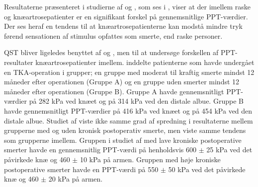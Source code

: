 \begin{table}[H]
	\centering
	\caption{I tabellen ses resultaterne vedrørende PPT-målinger på henholdsvis raske person og knæartrsoe patienter. }
	\label{tab:PPT_rask_syg}
\end{table}\vspace{-.25cm}

Resultaterne præsenteret i studierne af  og , som ses i , viser at der imellem raske og knæartrosepatienter er en signifikant forskel på gennemsnitlige PPT-værdier. Der ses heraf en tendens til at knæartrosepatienterne kan modstå mindre tryk førend sensationen af stimulus opfattes som smerte, end raske personer.

QST bliver ligeledes benyttet af  og , men til at undersøge forskellen af PPT-resultater knæartrosepatienter imellem.  inddelte patienterne som havde undergået en TKA-operation i grupper; en gruppe med moderat til kraftig smerte mindst 12 måneder efter operationen (Gruppe A) og en gruppe uden smerter mindst 12 måneder efter operationen (Gruppe B). Gruppe A havde gennemsnitligt PPT-værdier på 282 kPa ved knæet og på 314 kPa ved den distale albue. Gruppe B havde gennemsnitligt PPT-værdier på 416 kPa ved knæet og på 454 kPa ved den distale albue. Studiet af  viste ikke samme grad af spredning i resultaterne mellem grupperne med og uden kronisk postoperativ smerte, men viste samme tendens som  grupperne imellem. Gruppen i studiet af  med lave kroniske postoperative smerter havde en gennemsnitlig PPT-værdi på henholdsvis 600 $\pm$ 25 kPa ved det påvirkede knæ og 460 $\pm$ 10 kPa på armen. Gruppen med høje kroniske postoperative smerter havde en PPT-værdi på 550 $\pm$ 50 kPa ved det påvirkede knæ og 460 $\pm$ 20 kPa på armen. \citep{Petersen2015}

